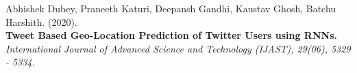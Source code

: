 \documentclass[letterpaper]{resume_config}
\begin{document}
\vspace{2pt}

Abhishek Dubey, Praneeth Katuri, Deepansh Gandhi, Kaustav Ghosh, Batchu Harshith. (2020). \\
{\textbf{Tweet Based Geo-Location Prediction of Twitter Users using RNNs.}} 
\\\textit{International Journal of Advanced Science and Technology (IJAST), 29(06), 5329 - 5334.}
\vspace{-6pt}




\vspace{-10pt}
\end{document}
